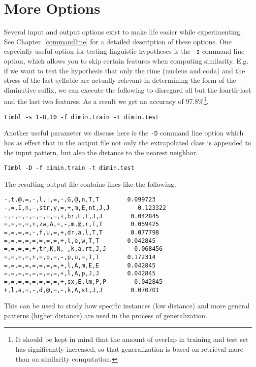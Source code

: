 \documentclass{report}
\begin{document}
\section{More Options}

Several input and output options exist to make life easier while
experimenting. See Chapter~\ref{commandline} for a detailed
description of these options. One especially useful option for testing
linguistic hypotheses is the {\tt -s} command line option, which
allows you to skip certain features when computing similarity. E.g. if
we want to test the hypothesis that only the rime (nucleus and coda)
and the stress of the last syllable are actually relevant in
determining the form of the diminutive suffix, we can execute the
following to disregard all but the fourth-last and the last two
features. As a result we get an accuracy of 97.8\%\footnote{It should
be kept in mind that the amount of overlap in training and test set
has significantly increased, so that generalization is based on
retrieval more than on similarity computation.}.

{\small
\begin{verbatim}
Timbl -s 1-8,10 -f dimin.train -t dimin.test
\end{verbatim}
}

Another useful parameter we discuss here is the {\tt -D} command line
option which has as effect that in the output file not only the
extrapolated class is appended to the input pattern, but also the
distance to the nearest neighbor.

{\small
\begin{verbatim}
Timbl -D -f dimin.train -t dimin.test
\end{verbatim}
}

The resulting output file contains lines like the following.

{\small
\begin{verbatim}
-,t,@,=,-,l,|,=,-,G,@,n,T,T        0.099723
-,=,I,n,-,str,y,=,+,m,E,nt,J,J        0.123322
=,=,=,=,=,=,=,=,+,br,L,t,J,J        0.042845
=,=,=,=,+,zw,A,=,-,m,@,r,T,T        0.059425
=,=,=,=,-,f,u,=,+,dr,a,l,T,T        0.077798
=,=,=,=,=,=,=,=,+,l,e,w,T,T        0.042845
=,=,=,=,+,tr,K,N,-,k,a,rt,J,J        0.068456
=,=,=,=,+,=,o,=,-,p,u,=,T,T        0.172314
=,=,=,=,=,=,=,=,+,l,A,m,E,E        0.042845
=,=,=,=,=,=,=,=,+,l,A,p,J,J        0.042845
=,=,=,=,=,=,=,=,+,sx,E,lm,P,P        0.042845
+,l,a,=,-,d,@,=,-,k,A,st,J,J        0.070701
\end{verbatim}
}

This can be used to study how specific instances (low distance) and
more general patterns (higher distance) are used in the process of
generalization.\\
\end{document}
